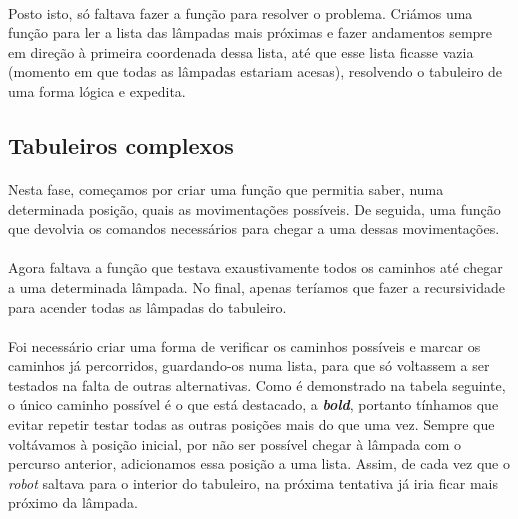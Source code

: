 \documentclass[a4paper,12pt]{article}
\begin{document}
\paragraph{}
Posto isto, só faltava fazer a função para resolver o problema. Criámos uma função para ler a lista das lâmpadas mais próximas e fazer andamentos sempre em direção à primeira coordenada dessa lista, até que esse lista ficasse vazia (momento em que todas as lâmpadas estariam acesas), resolvendo o tabuleiro de uma forma lógica e expedita.

\subsection{Tabuleiros complexos}

\paragraph{}
Nesta fase, começamos por criar uma função que permitia saber, numa determinada posição, quais as movimentações possíveis. De seguida, uma função que devolvia os comandos necessários para chegar a uma dessas movimentações.
\paragraph{}
Agora faltava a função que testava exaustivamente todos os caminhos até chegar a uma determinada lâmpada. No final, apenas teríamos que fazer a recursividade para acender todas as lâmpadas do tabuleiro.

\paragraph{}
Foi necessário criar uma forma de verificar os caminhos possíveis e marcar os caminhos já percorridos, guardando-os numa lista, para que só voltassem a ser testados na falta de outras alternativas. Como é demonstrado na tabela seguinte, o único caminho possível é o que está destacado, a \emph{\textbf{bold}}, portanto tínhamos que evitar repetir testar todas as outras posições mais do que uma vez. Sempre que voltávamos à posição inicial, por não ser possível chegar à lâmpada com o percurso anterior, adicionamos essa posição a uma lista. Assim, de cada vez que o \emph{robot} saltava para o interior do tabuleiro, na próxima tentativa já iria ficar mais próximo da lâmpada.
\end{document}
